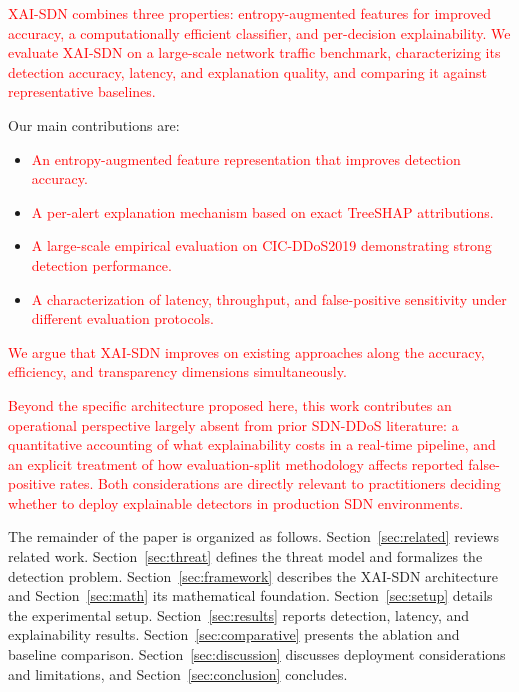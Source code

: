\documentclass{ieeeaccess}
\begin{document}
\textcolor{red}{XAI-SDN combines three properties: entropy-augmented features for improved accuracy, a computationally efficient classifier, and per-decision explainability.} \textcolor{red}{We evaluate XAI-SDN on a large-scale network traffic benchmark, characterizing its detection accuracy, latency, and explanation quality, and comparing it against representative baselines.}

Our main contributions are:
\begin{itemize}
\item \textcolor{red}{An entropy-augmented feature representation that improves detection accuracy.}
\item \textcolor{red}{A per-alert explanation mechanism based on exact TreeSHAP attributions.}
\item \textcolor{red}{A large-scale empirical evaluation on CIC-DDoS2019 demonstrating strong detection performance.}
\item \textcolor{red}{A characterization of latency, throughput, and false-positive sensitivity under different evaluation protocols.}
\end{itemize}

\textcolor{red}{We argue that XAI-SDN improves on existing approaches along the accuracy, efficiency, and transparency dimensions simultaneously.}

\textcolor{red}{Beyond the specific architecture proposed here, this work contributes an operational perspective largely absent from prior SDN-DDoS literature: a quantitative accounting of what explainability costs in a real-time pipeline, and an explicit treatment of how evaluation-split methodology affects reported false-positive rates. Both considerations are directly relevant to practitioners deciding whether to deploy explainable detectors in production SDN environments.}

The remainder of the paper is organized as follows. Section~\ref{sec:related} reviews related work. Section~\ref{sec:threat} defines the threat model and formalizes the detection problem. Section~\ref{sec:framework} describes the XAI-SDN architecture and Section~\ref{sec:math} its mathematical foundation. Section~\ref{sec:setup} details the experimental setup. Section~\ref{sec:results} reports detection, latency, and explainability results. Section~\ref{sec:comparative} presents the ablation and baseline comparison. Section~\ref{sec:discussion} discusses deployment considerations and limitations, and Section~\ref{sec:conclusion} concludes.
\end{document}
